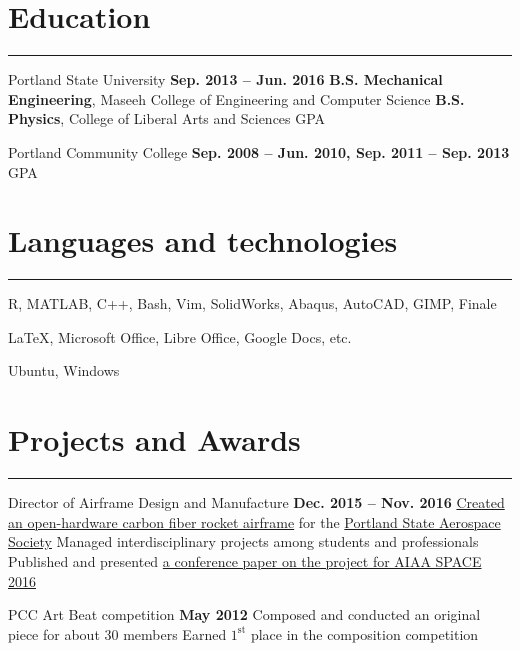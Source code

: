\section{Education}
	\noindent\rule{\textwidth}{\hlinewidth}
	\begin{innerlist}
	\item Portland State University		\hfill\textbf{Sep. 2013 -- Jun. 2016}
		\subitem \textbf{B.S. Mechanical Engineering}, Maseeh College of Engineering and Computer Science 
		\subitem\textbf{B.S. Physics}, College of Liberal Arts and Sciences
		 GPA
	\\
	\item Portland Community College  \hfill\textbf{Sep. 2008 -- Jun. 2010, Sep. 2011 -- Sep. 2013}
		 GPA
	\end{innerlist}
\vfill
\section{Languages and technologies}

\noindent\rule{\textwidth}{\hlinewidth}
    \begin{innerlist}
        \item R, MATLAB, C++, Bash, Vim, SolidWorks, Abaqus, AutoCAD, GIMP, Finale
        \item \LaTeX, Microsoft Office, Libre Office, Google Docs, etc.
	\item Ubuntu, Windows
    \end{innerlist}
\vfill
\section{Projects and Awards}
\noindent\rule{\textwidth}{\hlinewidth}
	\begin{innerlist}
	\item Director of Airframe Design and Manufacture
		\hfill\textbf{Dec. 2015 -- Nov. 2016} %
		\subitem \href{https://github.com/psas/sw-cad-airframe-lv3.0}{Created 
			an open-hardware carbon fiber rocket airframe} for the 
			\href{http://psas.pdx.edu/}{Portland State Aerospace Society}
		\subitem Managed interdisciplinary projects among students and professionals
		\subitem Published and presented \href{http://arc.aiaa.org/doi/pdf/10.2514/6.2016-5365}{a conference paper on the project for AIAA SPACE 2016}
	\\
	\item PCC Art Beat competition \hfill\textbf{May 2012}
		\subitem Composed and conducted an original piece for about 30 members
		\subitem Earned $1^\text{st}$ place in the composition competition
	\end{innerlist}
\vfill

